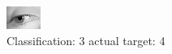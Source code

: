 \begin{figure}[h!]
\begin{center}
\includegraphics[width=0.60\columnwidth]{figures/ID2931_class_3_target_4.png}
\end{center}
\caption{ Classification: 3 actual target: 4}
\label{fig:ID2931_class_3_target_4}
\end{figure}
